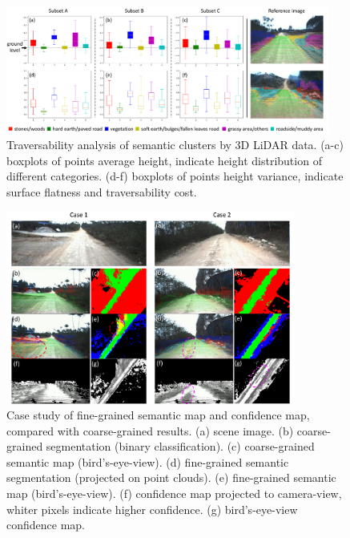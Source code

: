 \documentclass[letterpaper, 10 pt, conference]{ieeeconf}  %
\begin{document}
	\begin{figure}[]
		\centering
		\includegraphics[width=0.95\textwidth]{lidar_analysis.pdf}
		\caption{Traversability analysis of semantic clusters by 3D LiDAR data. (a-c) boxplots of points average height, indicate height distribution of different categories. (d-f) boxplots of points height variance, indicate surface flatness and traversability cost. }
		\label{fig:lidar_analysis}
		\vspace{-5mm}
	\end{figure}
	
	
	\begin{figure}[]
		\centering
		\includegraphics[width=0.85\textwidth]{semantic_mapping.pdf}
		\caption{Case study of fine-grained semantic map and confidence map, compared with coarse-grained  results. (a) scene image. (b) coarse-grained segmentation (binary classification). (c) coarse-grained semantic map (bird's-eye-view). (d) fine-grained semantic segmentation (projected on point clouds). (e) fine-grained semantic map (bird's-eye-view). (f) confidence map projected to camera-view, whiter pixels indicate higher confidence. (g) bird's-eye-view confidence map.}
		\label{fig:semantic_mapping}
		\vspace{-4mm}
	\end{figure}
	
\end{document}
